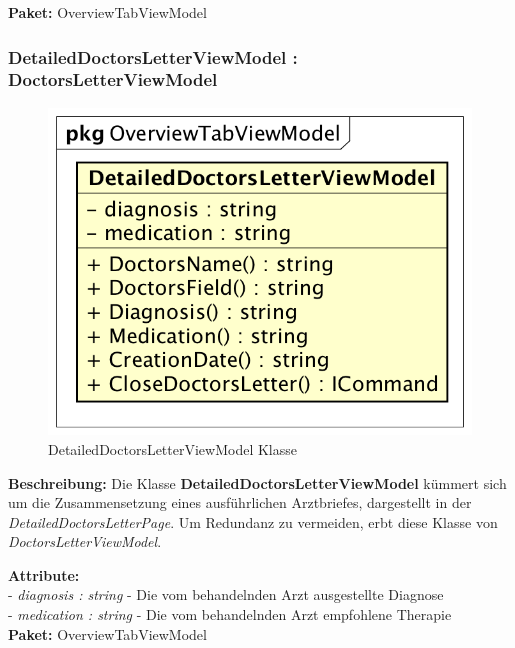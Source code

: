 \documentclass[a4paper]{scrreprt}
\begin{document}
\textbf{Paket:} OverviewTabViewModel

\subsubsection{DetailedDoctorsLetterViewModel : DoctorsLetterViewModel}
\begin{figure}[H]
\centering
\includegraphics[width=0.45\textheight]{graphics/Klassendiagramme/ViewModel/DetailedDoctorsLetterViewModel.png}
\caption{DetailedDoctorsLetterViewModel Klasse}
\end{figure}

\textbf{Beschreibung:} Die Klasse \textbf{DetailedDoctorsLetterViewModel} kümmert sich um die Zusammensetzung eines ausführlichen Arztbriefes, dargestellt in der \textit{DetailedDoctorsLetterPage}. Um Redundanz zu vermeiden, erbt diese Klasse von \textit{DoctorsLetterViewModel}.

\textbf{Attribute:}\\
- \textit{diagnosis : string} - Die vom behandelnden Arzt ausgestellte Diagnose\\
- \textit{medication : string} - Die vom behandelnden Arzt empfohlene Therapie\\

\textbf{Paket:} OverviewTabViewModel
\end{document}
